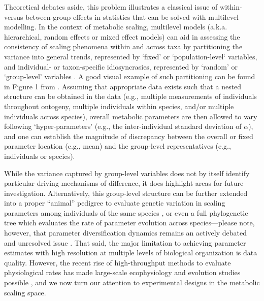 \documentclass[a4paper,12pt]{article}
\begin{document}
Theoretical debates aside, this problem illustrates a classical issue of within- versus between-group effects in statistics that can be solved with multilevel modelling. In the context of metabolic scaling, multilevel models (a.k.a. hierarchical, random effects or mixed effect models) can aid in assessing the consistency of scaling phenomena within and across taxa \citep[e.g.,][]{glazier2005biolrev, isaac2010ele, hirst2014ele, barneche2015pnas} by partitioning the variance into general trends, represented by `fixed' or `population-level` variables, and individual- or taxon-specific idiosyncrasies, represented by `random' or `group-level' variables \citep{vandepol2009animbehav, allgeier2015pnas, padfield2016ecollett, barneche2019functecol, garzke2019plosbiol, barton2020ele}. A good visual example of such partitioning can be found in Figure 1 from \cite{vandepol2009animbehav}. Assuming that appropriate data exists such that a nested structure can be obtained in the data (e.g., multiple measurements of individuals throughout ontogeny, multiple individuals within species, and/or multiple individuals across species), overall metabolic parameters are then allowed to vary following `hyper-parameters' (e.g., the inter-individual standard deviation of $\alpha$), and one can establish the magnitude of discrepancy between the overall or fixed parameter location (e.g., mean) and the group-level representatives (e.g., individuals or species).

While the variance captured by group-level variables does not by itself identify particular driving mechanisms of difference, it does highlight areas for future investigation. Alternatively, this group-level structure can be further extended into a proper ``animal'' pedigree to evaluate genetic variation in scaling parameters among individuals of the same species \citep{careau2015procb}, or even a full phylogenetic tree which evaluates the rate of parameter evolution across species---please note, however, that parameter diversification dynamics remains an actively debated and unresolved issue \citep{louca2020nature}. That said, the major limitation to achieving parameter estimates with high resolution at multiple levels of biological organization is data quality. However, the recent rise of high-throughput methods to evaluate physiological rates has made large-scale ecophysiology and evolution studies possible \citep{padfield2016ecollett, barneche2019functecol, malerba2018newphy, garzke2019plosbiol, barton2020ele}, and we now turn our attention to experimental designs in the metabolic scaling space.
\end{document}
